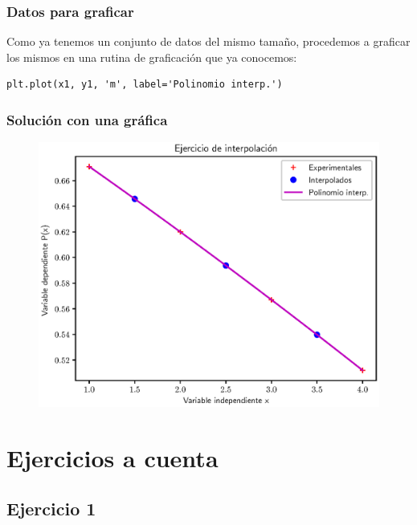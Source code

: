 \documentclass[12pt]{beamer}
\begin{document}
\begin{frame}[fragile]
\frametitle{Datos para graficar}
Como ya tenemos un conjunto de datos del mismo tamaño, procedemos a graficar los mismos en una rutina de graficación que ya conocemos:
\pause
\begin{lstlisting}[caption=Graficando los datos de interpolación]
plt.plot(x1, y1, 'm', label='Polinomio interp.')
\end{lstlisting}
\end{frame}
\begin{frame}
\frametitle{Solución con una gráfica}
\begin{figure}
    \centering
    \includegraphics[scale=0.58]{Imagenes/Ejercicio_Interpolacion_03.eps}
\end{figure}
\end{frame}
    

\section{Ejercicios a cuenta}
\subsection{Ejercicio 1}
\end{document}

